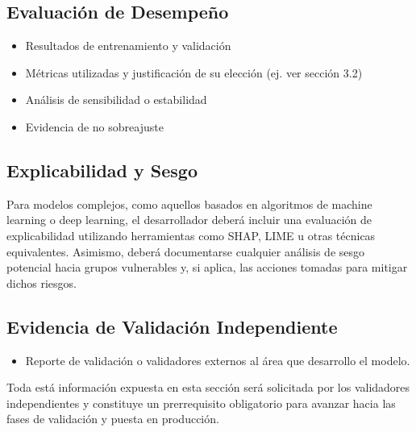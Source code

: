 \documentclass[11pt,oneside]{article}%
\begin{document}
\subsection{Evaluación de Desempeño}
\begin{itemize}
\item Resultados de entrenamiento y validación 
\item Métricas utilizadas y justificación de su elección (ej. ver sección 3.2)
\item Análisis de sensibilidad o estabilidad
\item Evidencia de no sobreajuste
\end{itemize}

\subsection{Explicabilidad y Sesgo}

Para modelos complejos, como aquellos basados en algoritmos de machine learning o deep learning, el desarrollador deberá incluir una evaluación de explicabilidad utilizando herramientas como SHAP, LIME u otras técnicas equivalentes. Asimismo, deberá documentarse cualquier análisis de sesgo potencial hacia grupos vulnerables y, si aplica, las acciones tomadas para mitigar dichos riesgos.\\

\subsection{Evidencia de Validación Independiente}

\begin{itemize}
\item Reporte de validación o validadores externos al área que desarrollo el modelo. 
\end{itemize}

Toda está información expuesta en esta sección será solicitada por los validadores independientes y constituye un prerrequisito obligatorio para avanzar hacia las fases de validación y puesta en producción. 

\end{document}
